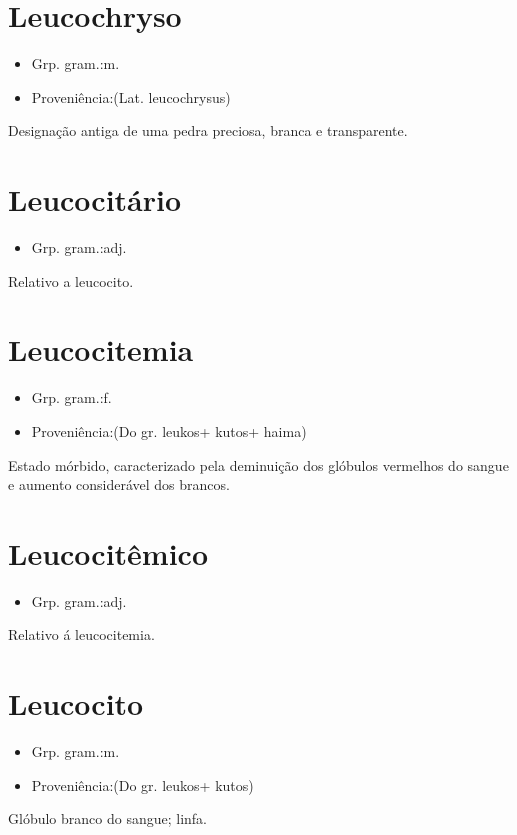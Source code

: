 \section{Leucochryso}
\begin{itemize}
\item {Grp. gram.:m.}
\end{itemize}
\begin{itemize}
\item {Proveniência:(Lat. \textunderscore leucochrysus\textunderscore )}
\end{itemize}
Designação antiga de uma pedra preciosa, branca e transparente.
\section{Leucocitário}
\begin{itemize}
\item {Grp. gram.:adj.}
\end{itemize}
Relativo a leucocito.
\section{Leucocitemia}
\begin{itemize}
\item {Grp. gram.:f.}
\end{itemize}
\begin{itemize}
\item {Proveniência:(Do gr. \textunderscore leukos\textunderscore  + \textunderscore kutos\textunderscore  + \textunderscore haima\textunderscore )}
\end{itemize}
Estado mórbido, caracterizado pela deminuição dos glóbulos vermelhos do sangue e aumento considerável dos brancos.
\section{Leucocitêmico}
\begin{itemize}
\item {Grp. gram.:adj.}
\end{itemize}
Relativo á leucocitemia.
\section{Leucocito}
\begin{itemize}
\item {Grp. gram.:m.}
\end{itemize}
\begin{itemize}
\item {Proveniência:(Do gr. \textunderscore leukos\textunderscore  + \textunderscore kutos\textunderscore )}
\end{itemize}
Glóbulo branco do sangue; linfa.

